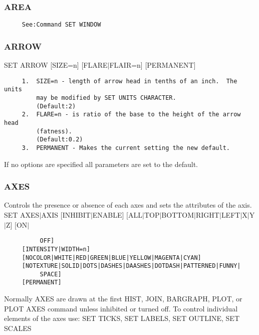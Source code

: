 \subsubsection{AREA}
\begin{verbatim}
     See:Command SET WINDOW 
\end{verbatim}
\subsubsection{ARROW}
SET ARROW [SIZE=n] [FLARE$|$FLAIR=n] [PERMANENT] 
\begin{verbatim}
     1.  SIZE=n - length of arrow head in tenths of an inch.  The units
         may be modified by SET UNITS CHARACTER.  
         (Default:2) 
     2.  FLARE=n - is ratio of the base to the height of the arrow head
         (fatness).  
         (Default:0.2) 
     3.  PERMANENT - Makes the current setting the new default.  
\end{verbatim}

If no options are specified all parameters are set to the default.  
\subsubsection{AXES}
Controls  the  presence or absence of each axes and sets the attributes
of the axis.  
SET AXES$|$AXIS [INHIBIT$|$ENABLE] [ALL$|$TOP$|$BOTTOM$|$RIGHT$|$LEFT$|$X$|$Y$|$Z] [ON$|$
\begin{verbatim}
          OFF] 
     [INTENSITY|WIDTH=n] 
     [NOCOLOR|WHITE|RED|GREEN|BLUE|YELLOW|MAGENTA|CYAN] 
     [NOTEXTURE|SOLID|DOTS|DASHES|DAASHES|DOTDASH|PATTERNED|FUNNY|
          SPACE] 
     [PERMANENT] 
\end{verbatim}

Normally  AXES  are  drawn  at the first HIST, JOIN, BARGRAPH, PLOT, or
PLOT  AXES  command  unless  inhibited  or  turned  off.   To   control
individual elements of the axes use:  
SET TICKS, SET LABELS, SET OUTLINE, SET SCALES 
